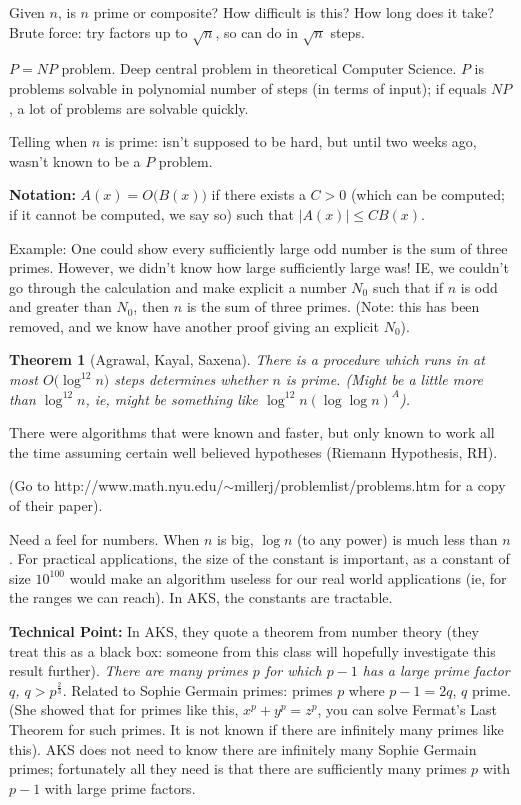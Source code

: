 \documentclass[12pt,letterpaper]{report}
\newtheorem{thm}{Theorem}[section]
\begin{document}
Given $n$, is $n$ prime or composite? How difficult is this? How
long does it take? Brute force: try factors up to $\sqrt{n}$, so
can do in $\sqrt{n}$ steps.

$P = NP$ problem. Deep central problem in theoretical Computer
Science. $P$ is problems solvable in polynomial number of steps
(in terms of input); if equals $NP$, a lot of problems are
solvable quickly.

Telling when $n$ is prime: isn't supposed to be hard, but until
two weeks ago, wasn't known to be a $P$ problem.

\textbf{Notation:} $A(x) = O\Big( B(x) \Big)$ if there exists a $C
> 0$ (which can be computed; if it cannot be computed, we say so)
such that $|A(x)| \le C B(x)$.

Example: One could show every sufficiently large odd number is the
sum of three primes. However, we didn't know how large
sufficiently large was! IE, we couldn't go through the calculation
and make explicit a number $N_0$ such that if $n$ is odd and
greater than $N_0$, then $n$ is the sum of three primes. (Note:
this has been removed, and we know have another proof giving an
explicit $N_0$).

\begin{thm}[Agrawal, Kayal, Saxena]There is a procedure which runs
in at most $O\Big(\log^{12} n \Big)$ steps determines whether $n$
is prime. (Might be a little more than $\log^{12} n$, ie, might be
something like $\log^{12} n (\log \log n)^A$).
\end{thm}

There were algorithms that were known and faster, but only known
to work all the time assuming certain well believed hypotheses
(Riemann Hypothesis, RH).

(Go to
http://www.math.nyu.edu/$\sim$millerj/problemlist/problems.htm for
a copy of their paper).

Need a feel for numbers. When $n$ is big, $\log n$ (to any power)
is much less than $n$. For practical applications, the size of the
constant is important, as a constant of size $10^{100}$ would make
an algorithm useless for our real world applications (ie, for the
ranges we can reach). In AKS, the constants are tractable.

\textbf{Technical Point:} In AKS, they quote a theorem from number
theory (they treat this as a black box: someone from this class
will hopefully investigate this result further). \emph{There are
many primes $p$ for which $p-1$ has a large prime factor $q$, $q >
p^{\frac{2}{3}}$}. Related to Sophie Germain primes: primes $p$
where $p-1 = 2q$, $q$ prime. (She showed that for primes like
this, $x^p + y^p = z^p$, you can solve Fermat's Last Theorem for
such primes. It is not known if there are infinitely many primes
like this). AKS does not need to know there are infinitely many
Sophie Germain primes; fortunately all they need is that there are
sufficiently many primes $p$ with $p-1$ with large prime factors.
\end{document}
